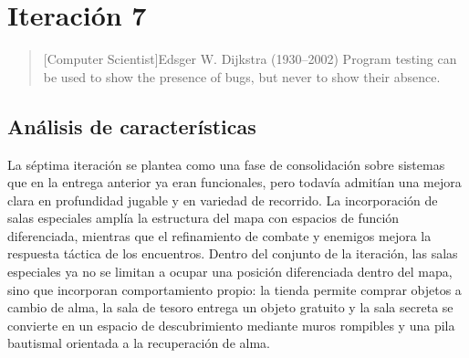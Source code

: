 \chapter{Iteración 7}

\begin{quotation}[Computer Scientist]{Edsger W. Dijkstra (1930--2002)}
Program testing can be used to show the presence of bugs, but never to show their absence.
\end{quotation}

\begin{abstract}
Esta iteración se orienta a consolidar sistemas ya introducidos y a extender la estructura
del recorrido con salas especiales. El trabajo integra la sala de tienda y el funcionamiento
de las salas secreta y de tesoro dentro de la generación procedural del mapa, además de
refinar el sistema de combate y el sistema de enemigos.
\end{abstract}

\section{Análisis de características}
La séptima iteración se plantea como una fase de consolidación sobre sistemas que en la
entrega anterior ya eran funcionales, pero todavía admitían una mejora clara en profundidad
jugable y en variedad de recorrido. La incorporación de salas especiales amplía la
estructura del mapa con espacios de función diferenciada, mientras que el refinamiento de
combate y enemigos mejora la respuesta táctica de los encuentros. Dentro del conjunto de la
iteración, las salas especiales ya no se limitan a ocupar una posición diferenciada dentro
del mapa, sino que incorporan comportamiento propio: la tienda permite comprar objetos a
cambio de alma, la sala de tesoro entrega un objeto gratuito y la sala secreta se convierte
en un espacio de descubrimiento mediante muros rompibles y una pila bautismal orientada a la
recuperación de alma.


